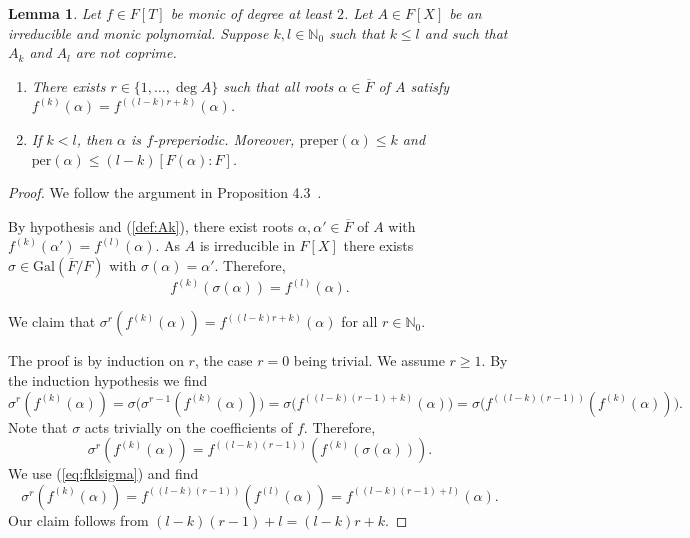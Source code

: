 \documentclass[12pt,oneside,a4]{amsart}
\newcommand{\IN}{\mathbb{N}}
\newcounter{maincounter}
\numberwithin{maincounter}{section}
\numberwithin{equation}{section}
\newtheorem{lemma}[maincounter]{Lemma}
\begin{document}
\begin{lemma}
  \label{lem:AkAlpreperiodic}
  Let $f\in F[T]$ be monic of degree at least $2$. Let
  $A\in F[X]$ be an irreducible and monic polynomial. Suppose
  $k,l\in\IN_0$ such that $k\le l$ and such that
  $A_k$ and $A_l$ are not coprime.
  \begin{enumerate}
  \item [(i)]  There exists $r\in
    \{1,\ldots,\deg A\}$ such that all roots $\alpha\in\overline F$ of
    $A$ satisfy $f^{(k)}(\alpha)=f^{((l-k)r+k)}(\alpha)$. 
  \item[(ii)] If $k<l$, then $\alpha$ is $f$-preperiodic. Moreover,
    $\mathrm{preper}(\alpha)\le k$ and
    $\mathrm{per}(\alpha)\le (l-k)[F(\alpha):F]$.
  \end{enumerate}
\end{lemma} 
\begin{proof}
  We follow the argument in Proposition 4.3~\cite{hs:2021lower}.
  
  By hypothesis and (\ref{def:Ak}), there exist roots 
  $\alpha,\alpha'\in\overline F$ of $A$ with
  $f^{(k)}(\alpha')=f^{(l)}(\alpha)$.
  As $A$ is irreducible in $F[X]$ there exists $\sigma\in
  \mathrm{Gal}(\overline F/F)$ with $\sigma(\alpha)=\alpha'$.
  Therefore,
  \begin{equation}
    \label{eq:fklsigma}
    f^{(k)}(\sigma(\alpha)) = f^{(l)}(\alpha).
  \end{equation}

  We claim that $\sigma^r (f^{(k)}(\alpha)) = f^{((l-k)r+k)}(\alpha)$
  for all $r\in\IN_0$.

  The proof is by induction on $r$, the case $r=0$ being trivial. We
  assume $r\ge
  1$. By the induction hypothesis we find
  \begin{equation*}
    \sigma^r (f^{(k)}(\alpha)) =
    \sigma\bigl(\sigma^{r-1}(f^{(k)}(\alpha))\bigr)
    = \sigma\bigl(f^{((l-k)(r-1)+k)}(\alpha)\bigr)
    =\sigma\bigl(f^{((l-k)(r-1))}(f^{(k)}(\alpha))\bigr). 
  \end{equation*}
  Note that $\sigma$ acts trivially on the coefficients of $f$.
  Therefore, 
  \begin{equation*}
    \sigma^r (f^{(k)}(\alpha)) 
    =f^{((l-k)(r-1))}(f^{(k)}(\sigma(\alpha))).
  \end{equation*}
  We use (\ref{eq:fklsigma}) and find 
  \begin{equation*}
    \sigma^r (f^{(k)}(\alpha)) 
    =f^{((l-k)(r-1))}(f^{(l)}(\alpha))=f^{((l-k)(r-1)+l)}(\alpha).
  \end{equation*}
  Our claim follows from $(l-k)(r-1)+l = (l-k)r+k$. 
  

\end{proof}
\end{document}
